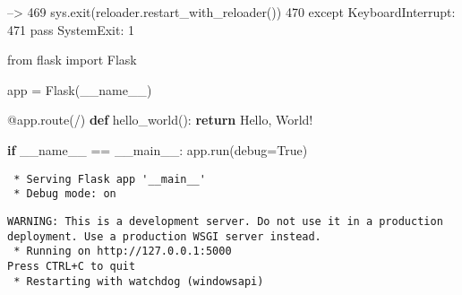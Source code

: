 \documentclass[
  letterpaper,
  DIV=11,
  numbers=noendperiod]{scrreprt}
\newenvironment{Shaded}{\begin{snugshade}}{\end{snugshade}}
\newcommand{\AttributeTok}[1]{\textcolor[rgb]{0.40,0.45,0.13}{#1}}
\newcommand{\ControlFlowTok}[1]{\textcolor[rgb]{0.00,0.23,0.31}{\textbf{#1}}}
\newcommand{\ImportTok}[1]{\textcolor[rgb]{0.00,0.46,0.62}{#1}}
\newcommand{\KeywordTok}[1]{\textcolor[rgb]{0.00,0.23,0.31}{\textbf{#1}}}
\newcommand{\NormalTok}[1]{\textcolor[rgb]{0.00,0.23,0.31}{#1}}
\newcommand{\OperatorTok}[1]{\textcolor[rgb]{0.37,0.37,0.37}{#1}}
\newcommand{\StringTok}[1]{\textcolor[rgb]{0.13,0.47,0.30}{#1}}
\newcommand{\VariableTok}[1]{\textcolor[rgb]{0.07,0.07,0.07}{#1}}
\begin{document}
\begin{Highlighting}
\textcolor{QuartoInternalColor2}{}\textcolor{QuartoInternalColor3}{--> 469}\textcolor{QuartoInternalColor2}{         sys}\textcolor{QuartoInternalColor8}{.}\textcolor{QuartoInternalColor2}{exit(reloader}\textcolor{QuartoInternalColor8}{.}\textcolor{QuartoInternalColor2}{restart_with_reloader())}
\textcolor{QuartoInternalColor2}{}\textcolor{QuartoInternalColor6}{    470}\textcolor{QuartoInternalColor2}{ }\textcolor{QuartoInternalColor7}{except}\textcolor{QuartoInternalColor2}{ }\textcolor{QuartoInternalColor13}{KeyboardInterrupt}\textcolor{QuartoInternalColor2}{:}
\textcolor{QuartoInternalColor2}{}\textcolor{QuartoInternalColor6}{    471}\textcolor{QuartoInternalColor2}{     }\textcolor{QuartoInternalColor7}{pass}\textcolor{QuartoInternalColor2}{}
\textcolor{QuartoInternalColor2}{}\textcolor{QuartoInternalColor1}{SystemExit}\textcolor{QuartoInternalColor2}{: 1}
\end{Highlighting}

\begin{Shaded}
\begin{Highlighting}[]
\ImportTok{from}\NormalTok{ flask }\ImportTok{import}\NormalTok{ Flask}

\NormalTok{app }\OperatorTok{=}\NormalTok{ Flask(}\VariableTok{\_\_name\_\_}\NormalTok{)}

\AttributeTok{@app.route}\NormalTok{(}\StringTok{\textquotesingle{}/\textquotesingle{}}\NormalTok{)}
\KeywordTok{def}\NormalTok{ hello\_world():}
    \ControlFlowTok{return} \StringTok{\textquotesingle{}Hello, World!\textquotesingle{}}

\ControlFlowTok{if} \VariableTok{\_\_name\_\_} \OperatorTok{==} \StringTok{\textquotesingle{}\_\_main\_\_\textquotesingle{}}\NormalTok{:}
\NormalTok{    app.run(debug}\OperatorTok{=}\VariableTok{True}\NormalTok{)}
\end{Highlighting}
\end{Shaded}

\begin{verbatim}
 * Serving Flask app '__main__'
 * Debug mode: on
\end{verbatim}

\begin{verbatim}
WARNING: This is a development server. Do not use it in a production deployment. Use a production WSGI server instead.
 * Running on http://127.0.0.1:5000
Press CTRL+C to quit
 * Restarting with watchdog (windowsapi)
\end{verbatim}

\end{document}
